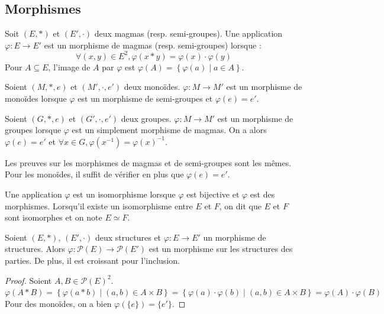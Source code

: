 \subsection{Morphismes}

\begin{definition}[Morphisme]
Soit $(E, *)$ et $(E', \cdot)$ deux magmas (resp. semi-groupes).
Une application $\varphi: E \rightarrow E'$ est un morphisme de magmas (resp. semi-groupes) lorsque :
$$
\forall (x, y) \in E^2, \varphi(x * y) = \varphi(x) \cdot \varphi(y)
$$
Pour $A \subseteq E$, l'image de $A$ par $\varphi$ est
$\varphi(A) = \left\{\varphi(a) \;|\; a \in A\right\}$.

Soient $(M, *, e)$ et $(M', \cdot, e')$ deux monoïdes.
$\varphi: M \rightarrow M'$ est un morphisme de monoïdes lorsque $\varphi$ est un morphisme de semi-groupes et $\varphi(e) = e'$.

Soient $(G, *, e)$ et $(G', \cdot, e')$ deux groupes.
$\varphi: M \rightarrow M'$ est un morphisme de groupes lorsque $\varphi$ est un
simplement morphisme de magmas. On a alors $\varphi(e) = e'$
et $\forall x \in G, \varphi(x^{-1}) = \varphi(x)^{-1}$.
\end{definition}

\begin{remarque}
Les preuves sur les morphismes de magmas et de semi-groupes sont les mêmes.
Pour les monoïdes, il suffit de vérifier en plus que $\varphi(e) = e'$.
\end{remarque}

\begin{definition}[Isomorphisme]
Une application $\varphi$ est un isomorphisme lorsque $\varphi$ est bijective et $\varphi$ est des morphismes.
Lorsqu'il existe un isomorphisme entre $E$ et $F$, on dit que $E$ et $F$ sont
isomorphes et on note $E \simeq F$.
\end{definition}

\begin{proposition}
Soient $(E, *)$, $(E', \cdot)$ deux structures et $\varphi: E \rightarrow E'$ un morphisme de structures.
Alors $\varphi: \mathcal{P}(E) \rightarrow \mathcal{P}(E')$ est
un morphisme sur les structures des parties.
De plus, il est croissant pour l'inclusion.
\end{proposition}

\begin{proof}
Soient $A, B \in \mathcal{P}(E)^2$. \\
$\varphi(A * B)
= \left\{ \varphi(a * b) \;|\; (a, b) \in A \times B \right\}
= \left\{ \varphi(a) \cdot \varphi(b) \;|\; (a, b) \in A \times B \right\}
= \varphi(A) \cdot \varphi(B)$ \\
Pour des monoïdes, on a bien $\varphi(\{e\}) = \{e'\}$.
\end{proof}


